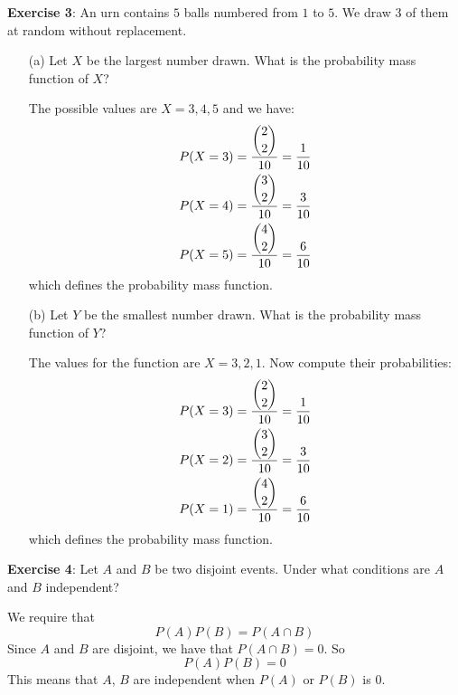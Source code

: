 \documentclass{article}
\begin{document}
\textbf{Exercise 3}: An urn contains $5$ balls numbered from $1$ to $5$. We draw $3$ of them at random without replacement.
    \begin{itemize}
        \item [(a)] Let $X$ be the largest number drawn. What is the probability mass function of $X$?
            \begin{answer}
                The possible values are $X = 3, 4, 5$ and we have:
                    \begin{align*}
                        P(X = 3) &= \dfrac{\dbinom{2}{2}}{10} = \dfrac{1}{10} \\
                        P(X = 4) &= \dfrac{\dbinom{3}{2}}{10} = \dfrac{3}{10} \\
                        P(X = 5) &= \dfrac{\dbinom{4}{2}}{10} = \dfrac{6}{10}   
                    \end{align*}
                which defines the probability mass function.
            \end{answer}

        \item [(b)] Let $Y$ be the smallest number drawn. What is the probability mass function of $Y$? 
            \begin{answer}
                The values for the function are $X = 3, 2, 1$. Now compute their probabilities:
                    \begin{align*}
                        P(X = 3) &= \dfrac{\dbinom{2}{2}}{10} = \dfrac{1}{10} \\
                        P(X = 2) &= \dfrac{\dbinom{3}{2}}{10} = \dfrac{3}{10} \\
                        P(X = 1) &= \dfrac{\dbinom{4}{2}}{10} = \dfrac{6}{10}   
                    \end{align*}
                which defines the probability mass function.
            \end{answer}
    \end{itemize}

\textbf{Exercise 4}: Let $A$ and $B$ be two disjoint events. Under what conditions are $A$ and $B$ independent?
    \begin{answer}
        We require that 
            \begin{equation*}
                P(A)P(B) = P(A \cap B)
            \end{equation*}
        Since $A$ and $B$ are disjoint, we have that $P(A \cap B) = 0$. So 
            \begin{equation*}
                P(A)P(B) = 0
            \end{equation*}
        This means that $A$, $B$ are independent when $P(A)$ or $P(B)$ is $0$.
    \end{answer}
\end{document}
